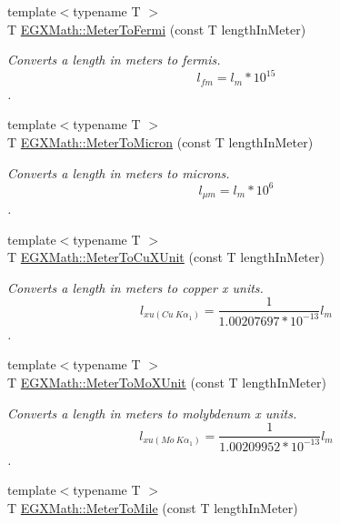 \begin{DoxyCompactItemize}
{\footnotesize template$<$typename T $>$ }\\T \mbox{\hyperlink{group___e_g_x_math-_conversions-_length_conversions-_s_i-_meter-_non-_s_i_ga2cf89a4a80da02e3e3c82e844095acfe}{E\+G\+X\+Math\+::\+Meter\+To\+Fermi}} (const T length\+In\+Meter)
\begin{DoxyCompactList}\small\item\em Converts a length in meters to fermis. \[ l_{fm}=l_{m} * 10^{15} \]. \end{DoxyCompactList}\item 
{\footnotesize template$<$typename T $>$ }\\T \mbox{\hyperlink{group___e_g_x_math-_conversions-_length_conversions-_s_i-_meter-_non-_s_i_ga9655833d43ede59b17c54a6f06f9681a}{E\+G\+X\+Math\+::\+Meter\+To\+Micron}} (const T length\+In\+Meter)
\begin{DoxyCompactList}\small\item\em Converts a length in meters to microns. \[ l_{\mu m}=l_{m} * 10^{6} \]. \end{DoxyCompactList}\item 
{\footnotesize template$<$typename T $>$ }\\T \mbox{\hyperlink{group___e_g_x_math-_conversions-_length_conversions-_s_i-_meter-_non-_s_i_ga67cec26b74704753fc51a8f4db27a4b4}{E\+G\+X\+Math\+::\+Meter\+To\+Cu\+X\+Unit}} (const T length\+In\+Meter)
\begin{DoxyCompactList}\small\item\em Converts a length in meters to copper x units. \[ l_{xu(Cu\ K\alpha_1)}= \frac{1}{1.00207697*10^{-13}} l_{m} \]. \end{DoxyCompactList}\item 
{\footnotesize template$<$typename T $>$ }\\T \mbox{\hyperlink{group___e_g_x_math-_conversions-_length_conversions-_s_i-_meter-_non-_s_i_gae0351200a3d90c4efe741c6057b2fd4b}{E\+G\+X\+Math\+::\+Meter\+To\+Mo\+X\+Unit}} (const T length\+In\+Meter)
\begin{DoxyCompactList}\small\item\em Converts a length in meters to molybdenum x units. \[ l_{xu(Mo\ K\alpha_1)}=\frac{1}{1.00209952*10^{-13}} l_{m} \]. \end{DoxyCompactList}\item 
{\footnotesize template$<$typename T $>$ }\\T \mbox{\hyperlink{group___e_g_x_math-_conversions-_length_conversions-_s_i-_meter-_imperial_gad99b2a17c589bee13f354975b326fe74}{E\+G\+X\+Math\+::\+Meter\+To\+Mile}} (const T length\+In\+Meter)

\end{DoxyCompactItemize}
